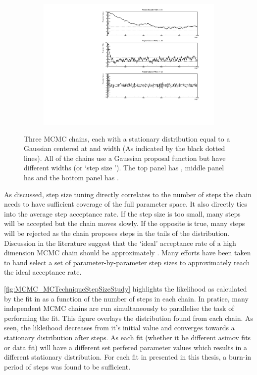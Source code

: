 \begin{figure}[h]
  \begin{subfigure}[t]{\textwidth}
    \includegraphics[width=\textwidth, trim={10mm 0mm 18mm 0mm}, clip,page=1]{Figures/MCMC/MCMCTechnique_StepSizes.pdf}
  \end{subfigure}
  \caption{Three MCMC chains, each with a stationary distribution equal to a Gaussian centered at  and width  (As indicated by the black dotted lines). All of the chains use a Gaussian proposal function but have different widths (or `step size \quickmath{\sigma}'). The top panel has , middle panel has  and the bottom panel has .}
  \label{fig:MCMC_MCTechniqueStepSizeStudy}
\end{figure}

As discussed, step size tuning directly correlates to the number of steps the chain needs to have sufficient coverage of the full parameter space. It also directly ties into the average step acceptance rate. If the step size is too small, many steps will be accepted but the chain moves slowly. If the opposite is true, many steps will be rejected as the chain proposes steps in the tails of the distribution. Discussion in the literature  suggest that the `ideal' acceptance rate of a high dimension MCMC chain should be approximately . Many efforts have been taken to hand select a set of parameter-by-parameter step sizes to approximately reach the ideal acceptance rate.

\autoref{fig:MCMC_MCTechniqueStepSizeStudy} highlights the likelihood as calculated by the fit in  as a function of the number of steps in each chain. In pratice, many independent MCMC chains are run simultaneously to parallelise the task of performing the fit. This figure overlays the distribution found from each chain. As seen, the likleihood decreases from it's initial value and converges towards a stationary distribution after  steps. As each fit (whether it be different asimov fits or data fit) will have a different set perfered parameter values which results in a different stationary distribution. For each fit in presented in this thesis, a burn-in period of  steps was found to be sufficient.

